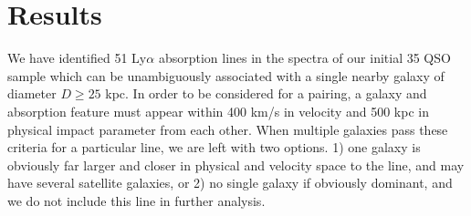 \documentclass[iop]{emulateapj-rtx4}
\begin{document}


\section{Results}

We have identified 51 Ly$\alpha$ absorption lines in the spectra of our initial 35 QSO sample which can be unambiguously associated with a single nearby galaxy of diameter $D\geq25$ kpc. In order to be considered for a pairing, a galaxy and absorption feature must appear within 400 km/s in velocity and 500 kpc in physical impact parameter from each other. When multiple galaxies pass these criteria for a particular line, we are left with two options. 1) one galaxy is obviously far larger and closer in physical and velocity space to the line, and may have several satellite galaxies, or 2) no single galaxy if obviously dominant, and we do not include this line in further analysis. 
\end{document}
